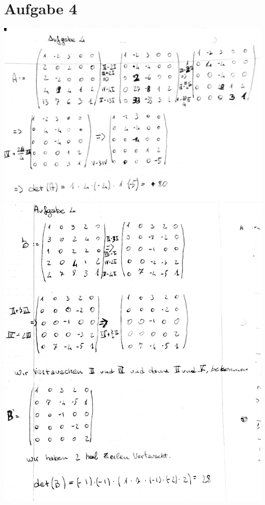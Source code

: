 \documentclass[10pt,a4paper]{article}
\begin{document}
\section{Aufgabe 4}
\includegraphics[scale=0.2]{la_t12_5.jpg} \\
\includegraphics[scale=0.2]{la_t12_6.jpg} \\
\end{document}
